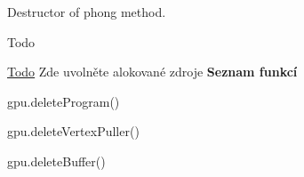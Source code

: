 Destructor of phong method. 

\begin{DoxyRefDesc}{Todo}
\item[\hyperlink{todo__todo000042}{Todo}]Zde uvolněte alokované zdroje {\bfseries Seznam funkcí}
\begin{DoxyItemize}
\item gpu.\+delete\+Program()
\item gpu.\+delete\+Vertex\+Puller()
\item gpu.\+delete\+Buffer() 
\end{DoxyItemize}\end{DoxyRefDesc}

